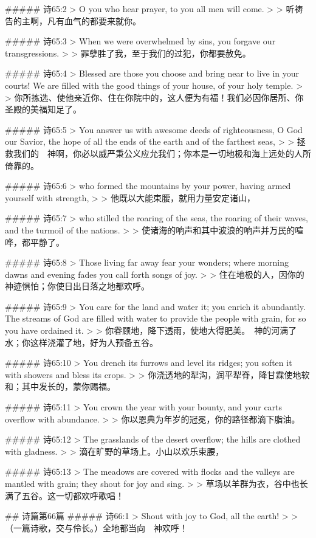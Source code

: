 ##### 诗65:2
> O you who hear prayer, to you all men will come.
>
> 听祷告的主啊，凡有血气的都要来就你。


##### 诗65:3
> When we were overwhelmed by sins, you forgave our transgressions.
>
> 罪孽胜了我，至于我们的过犯，你都要赦免。


##### 诗65:4
> Blessed are those you choose and bring near to live in your courts! We are filled with the good things of your house, of your holy temple.
>
> 你所拣选、使他亲近你、住在你院中的，这人便为有福！我们必因你居所、你圣殿的美福知足了。


##### 诗65:5
> You answer us with awesome deeds of righteousness, O God our Savior, the hope of all the ends of the earth and of the farthest seas,
>
> 拯救我们的　神啊，你必以威严秉公义应允我们；你本是一切地极和海上远处的人所倚靠的。


##### 诗65:6
> who formed the mountains by your power, having armed yourself with strength,
>
> 他既以大能束腰，就用力量安定诸山，


##### 诗65:7
> who stilled the roaring of the seas, the roaring of their waves, and the turmoil of the nations.
>
> 使诸海的响声和其中波浪的响声并万民的喧哗，都平静了。


##### 诗65:8
> Those living far away fear your wonders; where morning dawns and evening fades you call forth songs of joy.
>
> 住在地极的人，因你的神迹惧怕；你使日出日落之地都欢呼。


##### 诗65:9
> You care for the land and water it; you enrich it abundantly. The streams of God are filled with water to provide the people with grain, for so you have ordained it.
>
> 你眷顾地，降下透雨，使地大得肥美。　神的河满了水；你这样浇灌了地，好为人预备五谷。


##### 诗65:10
> You drench its furrows and level its ridges; you soften it with showers and bless its crops.
>
> 你浇透地的犁沟，润平犁脊，降甘霖使地软和；其中发长的，蒙你赐福。


##### 诗65:11
> You crown the year with your bounty, and your carts overflow with abundance.
>
> 你以恩典为年岁的冠冕，你的路径都滴下脂油。


##### 诗65:12
> The grasslands of the desert overflow; the hills are clothed with gladness.
>
> 滴在旷野的草场上。小山以欢乐束腰，


##### 诗65:13
> The meadows are covered with flocks and the valleys are mantled with grain; they shout for joy and sing.
>
> 草场以羊群为衣，谷中也长满了五谷。这一切都欢呼歌唱！


## 诗篇第66篇
##### 诗66:1
> Shout with joy to God, all the earth!
>
> （一篇诗歌，交与伶长。）全地都当向　神欢呼！


